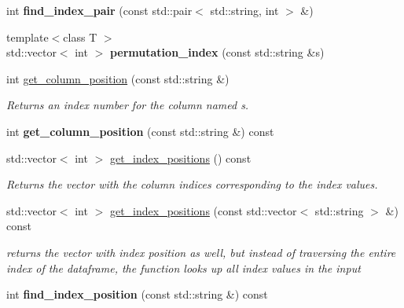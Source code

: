 \begin{DoxyCompactItemize}
int {\bfseries find\+\_\+index\+\_\+pair} (const std\+::pair$<$ std\+::string, int $>$ \&)
\item 
\mbox{\label{classDataFrame_af53a20136b2c32d204eec54befc037df}} 
{\footnotesize template$<$class T $>$ }\\std\+::vector$<$ int $>$ {\bfseries permutation\+\_\+index} (const std\+::string \&s)
\item 
int \hyperlink{classDataFrame_ab65a5511fe18187411de973f99f196cd}{get\+\_\+column\+\_\+position} (const std\+::string \&)
\begin{DoxyCompactList}\small\item\em Returns an index number for the column named s. \end{DoxyCompactList}\item 
\mbox{\label{classDataFrame_a8fbc548d04ff3217809f737c1a6b0e9d}} 
int {\bfseries get\+\_\+column\+\_\+position} (const std\+::string \&) const
\item 
std\+::vector$<$ int $>$ \hyperlink{classDataFrame_ae396eea4635ae7379d5fde60c7e26e61}{get\+\_\+index\+\_\+positions} () const
\begin{DoxyCompactList}\small\item\em Returns the vector with the column indices corresponding to the index values. \end{DoxyCompactList}\item 
\mbox{\label{classDataFrame_ac3b6078a1f93a0e11a262d42583c59d3}} 
std\+::vector$<$ int $>$ \hyperlink{classDataFrame_ac3b6078a1f93a0e11a262d42583c59d3}{get\+\_\+index\+\_\+positions} (const std\+::vector$<$ std\+::string $>$ \&) const
\begin{DoxyCompactList}\small\item\em returns the vector with index position as well, but instead of traversing the entire index of the dataframe, the function looks up all index values in the input \end{DoxyCompactList}\item 
\mbox{\label{classDataFrame_a9f2d00ceb463fe70ffedabc8152628c3}} 
int {\bfseries find\+\_\+index\+\_\+position} (const std\+::string \&) const
\item 
\mbox{\label{classDataFrame_a3560b7fd300654f336d47f7843e51f42}} 

\end{DoxyCompactItemize}
